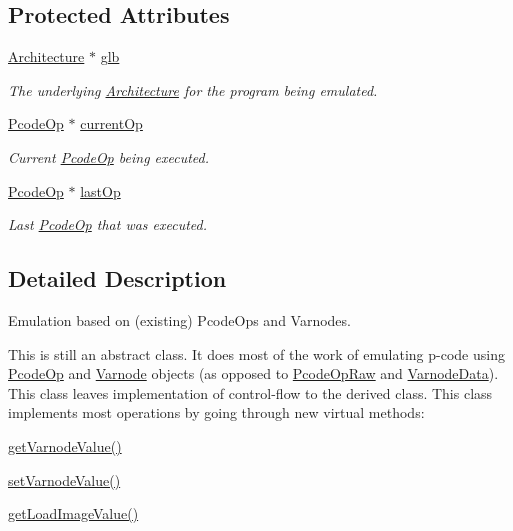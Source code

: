 \subsection*{Protected Attributes}
\begin{DoxyCompactItemize}
\item 
\mbox{\hyperlink{class_architecture}{Architecture}} $\ast$ \mbox{\hyperlink{class_emulate_pcode_op_a42e18029a70d836acb3fd457a185b11a}{glb}}
\begin{DoxyCompactList}\small\item\em The underlying \mbox{\hyperlink{class_architecture}{Architecture}} for the program being emulated. \end{DoxyCompactList}\item 
\mbox{\hyperlink{class_pcode_op}{Pcode\+Op}} $\ast$ \mbox{\hyperlink{class_emulate_pcode_op_ab52f4b9da769c03f03988e9500a565e8}{current\+Op}}
\begin{DoxyCompactList}\small\item\em Current \mbox{\hyperlink{class_pcode_op}{Pcode\+Op}} being executed. \end{DoxyCompactList}\item 
\mbox{\hyperlink{class_pcode_op}{Pcode\+Op}} $\ast$ \mbox{\hyperlink{class_emulate_pcode_op_a37c1a6611accb11ed7f4fc242e1d6a3b}{last\+Op}}
\begin{DoxyCompactList}\small\item\em Last \mbox{\hyperlink{class_pcode_op}{Pcode\+Op}} that was executed. \end{DoxyCompactList}\end{DoxyCompactItemize}


\subsection{Detailed Description}
Emulation based on (existing) Pcode\+Ops and Varnodes. 

This is still an abstract class. It does most of the work of emulating p-\/code using \mbox{\hyperlink{class_pcode_op}{Pcode\+Op}} and \mbox{\hyperlink{class_varnode}{Varnode}} objects (as opposed to \mbox{\hyperlink{class_pcode_op_raw}{Pcode\+Op\+Raw}} and \mbox{\hyperlink{struct_varnode_data}{Varnode\+Data}}). This class leaves implementation of control-\/flow to the derived class. This class implements most operations by going through new virtual methods\+:
\begin{DoxyItemize}
\item \mbox{\hyperlink{class_emulate_pcode_op_a90f1046ddac488b5a88b5b151a307eca}{get\+Varnode\+Value()}}
\item \mbox{\hyperlink{class_emulate_pcode_op_a44bfa9a3b6d87135a6bfc6680d01ea27}{set\+Varnode\+Value()}}
\item \mbox{\hyperlink{class_emulate_pcode_op_ad0820672a7c9f2a1a2457239f8d59378}{get\+Load\+Image\+Value()}}
\end{DoxyItemize}

